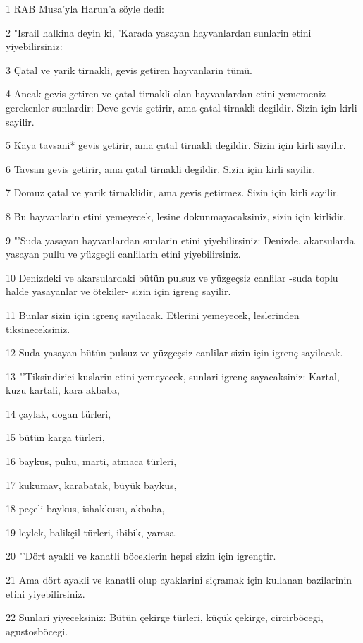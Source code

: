 \par 1 RAB Musa'yla Harun'a söyle dedi:
\par 2 "Israil halkina deyin ki, 'Karada yasayan hayvanlardan sunlarin etini yiyebilirsiniz:
\par 3 Çatal ve yarik tirnakli, gevis getiren hayvanlarin tümü.
\par 4 Ancak gevis getiren ve çatal tirnakli olan hayvanlardan etini yememeniz gerekenler sunlardir: Deve gevis getirir, ama çatal tirnakli degildir. Sizin için kirli sayilir.
\par 5 Kaya tavsani* gevis getirir, ama çatal tirnakli degildir. Sizin için kirli sayilir.
\par 6 Tavsan gevis getirir, ama çatal tirnakli degildir. Sizin için kirli sayilir.
\par 7 Domuz çatal ve yarik tirnaklidir, ama gevis getirmez. Sizin için kirli sayilir.
\par 8 Bu hayvanlarin etini yemeyecek, lesine dokunmayacaksiniz, sizin için kirlidir.
\par 9 "'Suda yasayan hayvanlardan sunlarin etini yiyebilirsiniz: Denizde, akarsularda yasayan pullu ve yüzgeçli canlilarin etini yiyebilirsiniz.
\par 10 Denizdeki ve akarsulardaki bütün pulsuz ve yüzgeçsiz canlilar -suda toplu halde yasayanlar ve ötekiler- sizin için igrenç sayilir.
\par 11 Bunlar sizin için igrenç sayilacak. Etlerini yemeyecek, leslerinden tiksineceksiniz.
\par 12 Suda yasayan bütün pulsuz ve yüzgeçsiz canlilar sizin için igrenç sayilacak.
\par 13 "'Tiksindirici kuslarin etini yemeyecek, sunlari igrenç sayacaksiniz: Kartal, kuzu kartali, kara akbaba,
\par 14 çaylak, dogan türleri,
\par 15 bütün karga türleri,
\par 16 baykus, puhu, marti, atmaca türleri,
\par 17 kukumav, karabatak, büyük baykus,
\par 18 peçeli baykus, ishakkusu, akbaba,
\par 19 leylek, balikçil türleri, ibibik, yarasa.
\par 20 "'Dört ayakli ve kanatli böceklerin hepsi sizin için igrençtir.
\par 21 Ama dört ayakli ve kanatli olup ayaklarini siçramak için kullanan bazilarinin etini yiyebilirsiniz.
\par 22 Sunlari yiyeceksiniz: Bütün çekirge türleri, küçük çekirge, circirböcegi, agustosböcegi.
